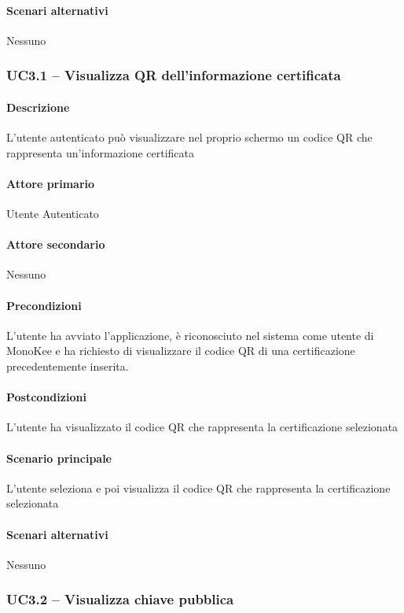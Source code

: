 \paragraph{Scenari alternativi}  Nessuno





\subsubsection{UC3.1 – Visualizza QR dell’informazione certificata}
\paragraph{Descrizione}  L’utente autenticato può visualizzare nel proprio schermo un codice QR che rappresenta un’informazione certificata
\paragraph{Attore primario}  Utente Autenticato
\paragraph{Attore secondario}  Nessuno
\paragraph{Precondizioni}  L’utente ha avviato l’applicazione, è riconosciuto nel sistema come utente di MonoKee e ha richiesto di visualizzare il codice QR di una certificazione precedentemente inserita.
\paragraph{Postcondizioni}  L’utente ha visualizzato il codice QR che rappresenta la certificazione selezionata
\paragraph{Scenario principale}  
L’utente seleziona e poi visualizza il codice QR che rappresenta la certificazione selezionata
\paragraph{Scenari alternativi}  Nessuno


\subsubsection{UC3.2 – Visualizza chiave pubblica}
